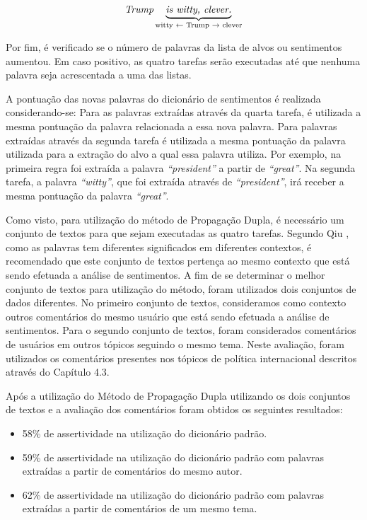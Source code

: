 \[\textit{Trump} \underbrace{\textit{is witty, clever.}}_\text{witty
\textleftarrow \text{ Trump} \textrightarrow \text{ clever}}\]

Por fim, é verificado se o número de palavras da lista de alvos ou sentimentos
aumentou. Em caso positivo, as quatro tarefas serão executadas até que nenhuma palavra seja acrescentada a
uma das listas.

A pontuação das novas palavras do dicionário de sentimentos é realizada
considerando-se: Para as palavras extraídas através da quarta tarefa, é
utilizada a mesma pontuação da palavra relacionada a essa nova palavra. Para palavras extraídas através da segunda tarefa é utilizada a mesma pontuação
da palavra utilizada para a extração do alvo a qual essa palavra utiliza. Por
exemplo, na primeira regra foi extraída a palavra \textit{``president''} a partir de \textit{``great''}. Na segunda tarefa, a palavra
\textit{``witty''}, que foi extraída através de \textit{``president''}, irá
receber a mesma pontuação da palavra \textit{``great''}.

Como visto, para utilização do método de Propagação Dupla, é necessário um
conjunto de textos para que sejam executadas as quatro tarefas. Segundo Qiu
\cite{Qiu:2011:OWE:1970420.1970422}, como as palavras tem diferentes
significados em diferentes contextos, é recomendado que este conjunto de textos
pertença ao mesmo contexto que está sendo efetuada a análise de sentimentos.
A fim de se determinar o melhor conjunto de textos para utilização do método,
foram utilizados dois conjuntos de dados diferentes. No primeiro conjunto de
textos, consideramos como contexto outros comentários do mesmo usuário que
 está sendo efetuada a análise de sentimentos. Para o segundo conjunto de
 textos, foram considerados comentários de usuários em outros tópicos seguindo o
 mesmo tema. Neste avaliação, foram utilizados os comentários presentes nos
 tópicos de política internacional descritos através do Capítulo 4.3.
 

 
Após a utilização do Método de Propagação Dupla utilizando os dois conjuntos de
textos e a avaliação dos comentários foram
obtidos os seguintes resultados:
\begin{itemize}
  \item 58\% de assertividade na utilização do dicionário padrão.
  \item 59\% de assertividade na utilização do dicionário padrão com palavras
  extraídas a partir de comentários do mesmo autor.
  \item 62\% de assertividade na utilização do dicionário padrão com palavras
  extraídas a partir de comentários de um mesmo tema.
\end{itemize}
 
